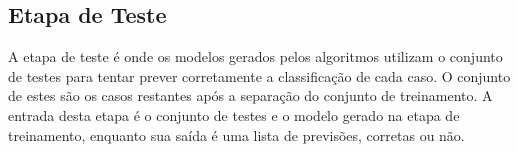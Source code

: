 \subsection{Etapa de Teste}
\label{subsec:etapa-teste}

A etapa de teste é onde os modelos gerados pelos algoritmos utilizam o conjunto de testes para tentar prever corretamente a classificação de cada caso. O conjunto de estes são os casos restantes após a separação do conjunto de treinamento. A entrada desta etapa é o conjunto de testes e o modelo gerado na etapa de treinamento, enquanto sua saída é uma lista de previsões, corretas ou não.